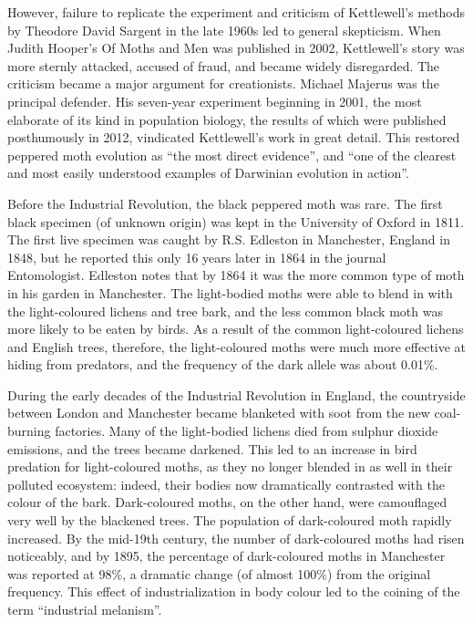 However, failure to replicate the experiment and criticism of Kettlewell's methods by Theodore David Sargent in the late 1960s led to general skepticism. When Judith Hooper's Of Moths and Men was published in 2002, Kettlewell's story was more sternly attacked, accused of fraud, and became widely disregarded. The criticism became a major argument for creationists. Michael Majerus was the principal defender. His seven-year experiment beginning in 2001, the most elaborate of its kind in population biology, the results of which were published posthumously in 2012, vindicated Kettlewell's work in great detail. This restored peppered moth evolution as ``the most direct evidence'', and ``one of the clearest and most easily understood examples of Darwinian evolution in action''.

Before the Industrial Revolution, the black peppered moth was rare. The first black specimen (of unknown origin) was kept in the University of Oxford in 1811. The first live specimen was caught by R.S. Edleston in Manchester, England in 1848, but he reported this only 16 years later in 1864 in the journal Entomologist. Edleston notes that by 1864 it was the more common type of moth in his garden in Manchester. The light-bodied moths were able to blend in with the light-coloured lichens and tree bark, and the less common black moth was more likely to be eaten by birds. As a result of the common light-coloured lichens and English trees, therefore, the light-coloured moths were much more effective at hiding from predators, and the frequency of the dark allele was about 0.01\%.

During the early decades of the Industrial Revolution in England, the countryside between London and Manchester became blanketed with soot from the new coal-burning factories. Many of the light-bodied lichens died from sulphur dioxide emissions, and the trees became darkened. This led to an increase in bird predation for light-coloured moths, as they no longer blended in as well in their polluted ecosystem: indeed, their bodies now dramatically contrasted with the colour of the bark. Dark-coloured moths, on the other hand, were camouflaged very well by the blackened trees. The population of dark-coloured moth rapidly increased. By the mid-19th century, the number of dark-coloured moths had risen noticeably, and by 1895, the percentage of dark-coloured moths in Manchester was reported at 98\%, a dramatic change (of almost 100\%) from the original frequency. This effect of industrialization in body colour led to the coining of the term ``industrial melanism''.

